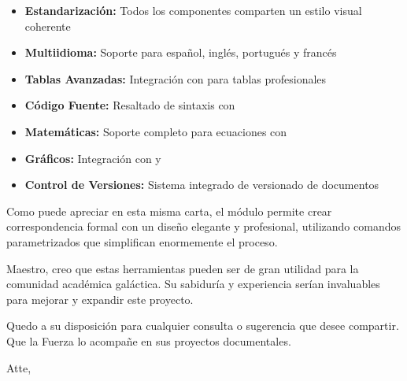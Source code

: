 \documentclass[spanish]{pt-letter}
\begin{document}
\begin{itemize}
    \item \textbf{Estandarización:} Todos los componentes comparten un estilo visual coherente
    \item \textbf{Multiidioma:} Soporte para español, inglés, portugués y francés
    \item \textbf{Tablas Avanzadas:} Integración con  para tablas profesionales
    \item \textbf{Código Fuente:} Resaltado de sintaxis con 
    \item \textbf{Matemáticas:} Soporte completo para ecuaciones con 
    \item \textbf{Gráficos:} Integración con  y 
    \item \textbf{Control de Versiones:} Sistema integrado de versionado de documentos
\end{itemize}

Como puede apreciar en esta misma carta, el módulo  permite crear correspondencia formal con un diseño elegante y profesional, utilizando comandos parametrizados que simplifican enormemente el proceso.

Maestro, creo que estas herramientas pueden ser de gran utilidad para la comunidad académica galáctica. Su sabiduría y experiencia serían invaluables para mejorar y expandir este proyecto.

Quedo a su disposición para cualquier consulta o sugerencia que desee compartir. Que la Fuerza lo acompañe en sus proyectos documentales.

Atte,
\end{document}
